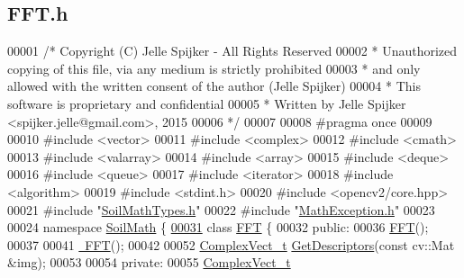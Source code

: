 \hypertarget{_f_f_t_8h_source}{}\subsection{F\+F\+T.\+h}
\label{_f_f_t_8h_source}

\begin{DoxyCode}
00001 \textcolor{comment}{/* Copyright (C) Jelle Spijker - All Rights Reserved}
00002 \textcolor{comment}{ * Unauthorized copying of this file, via any medium is strictly prohibited}
00003 \textcolor{comment}{ * and only allowed with the written consent of the author (Jelle Spijker)}
00004 \textcolor{comment}{ * This software is proprietary and confidential}
00005 \textcolor{comment}{ * Written by Jelle Spijker <spijker.jelle@gmail.com>, 2015}
00006 \textcolor{comment}{ */}
00007 
00008 \textcolor{preprocessor}{#pragma once}
00009 
00010 \textcolor{preprocessor}{#include <vector>}
00011 \textcolor{preprocessor}{#include <complex>}
00012 \textcolor{preprocessor}{#include <cmath>}
00013 \textcolor{preprocessor}{#include <valarray>}
00014 \textcolor{preprocessor}{#include <array>}
00015 \textcolor{preprocessor}{#include <deque>}
00016 \textcolor{preprocessor}{#include <queue>}
00017 \textcolor{preprocessor}{#include <iterator>}
00018 \textcolor{preprocessor}{#include <algorithm>}
00019 \textcolor{preprocessor}{#include <stdint.h>}
00020 \textcolor{preprocessor}{#include <opencv2/core.hpp>}
00021 \textcolor{preprocessor}{#include "\hyperlink{_soil_math_types_8h}{SoilMathTypes.h}"}
00022 \textcolor{preprocessor}{#include "\hyperlink{_math_exception_8h}{MathException.h}"}
00023 
00024 \textcolor{keyword}{namespace }\hyperlink{namespace_soil_math}{SoilMath} \{
\hypertarget{_f_f_t_8h_source_l00031}{}\hyperlink{class_soil_math_1_1_f_f_t}{00031} \textcolor{keyword}{class }\hyperlink{class_soil_math_1_1_f_f_t}{FFT} \{
00032 \textcolor{keyword}{public}:
00036   \hyperlink{class_soil_math_1_1_f_f_t_a52638bf8f971d1448e46b2b6db5f5e8b}{FFT}();
00037 
00041   \hyperlink{class_soil_math_1_1_f_f_t_a279862b286d865ebc5aa707f94f19d73}{~FFT}();
00042 
00052   \hyperlink{_soil_math_types_8h_a7567e521c2b2c408dcb62dbff72390f7}{ComplexVect\_t} \hyperlink{class_soil_math_1_1_f_f_t_af5fb6f4804079ee184a314e2f0a0f2fc}{GetDescriptors}(\textcolor{keyword}{const} cv::Mat &img);
00053 
00054 \textcolor{keyword}{private}:
00055   \hyperlink{_soil_math_types_8h_a7567e521c2b2c408dcb62dbff72390f7}{ComplexVect\_t}

\end{DoxyCode}
